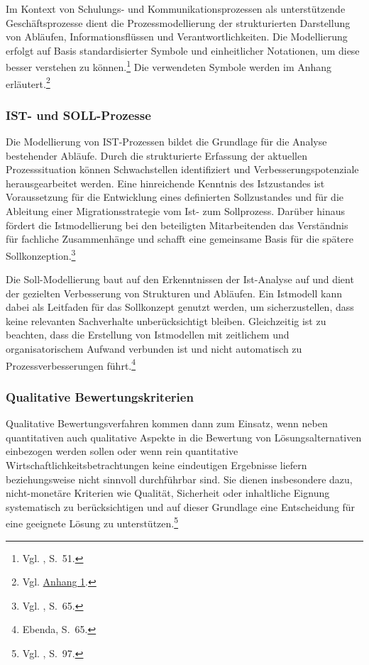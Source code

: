 \documentclass[
    12pt, 
    a4paper,
    ]{scrartcl} %
\begin{document}
Im Kontext von Schulungs- und Kommunikationsprozessen als unterstützende Geschäftsprozesse dient die Prozessmodellierung der strukturierten Darstellung von Abläufen, Informationsflüssen und Verantwortlichkeiten. Die Modellierung erfolgt auf Basis standardisierter Symbole und einheitlicher Notationen, um diese besser verstehen zu können.\footnote{Vgl. \cite{Koch_Geschaeftsprozessmanagement}, S.~51.} Die verwendeten Symbole werden im Anhang erläutert.\footnote{Vgl. \hyperref[sec:Anhang1]{Anhang 1}.} 

\subsubsection{IST- und SOLL-Prozesse}
Die Modellierung von IST-Prozessen bildet die Grundlage für die Analyse bestehender Abläufe. Durch die strukturierte Erfassung der aktuellen Prozesssituation können Schwachstellen identifiziert und Verbesserungspotenziale herausgearbeitet werden. Eine hinreichende Kenntnis des Istzustandes ist Voraussetzung für die Entwicklung eines definierten Sollzustandes und für die Ableitung einer Migrationsstrategie vom Ist- zum Sollprozess. Darüber hinaus fördert die Istmodellierung bei den beteiligten Mitarbeitenden das Verständnis für fachliche Zusammenhänge und schafft eine gemeinsame Basis für die spätere Sollkonzeption.\footnote{Vgl. \cite{Koch_Geschaeftsprozessmanagement}, S.~65.} 

Die Soll-Modellierung baut auf den Erkenntnissen der Ist-Analyse auf und dient der gezielten Verbesserung von Strukturen und Abläufen. Ein Istmodell kann dabei als Leitfaden für das Sollkonzept genutzt werden, um sicherzustellen, dass keine relevanten Sachverhalte unberücksichtigt bleiben. Gleichzeitig ist zu beachten, dass die Erstellung von Istmodellen mit zeitlichem und organisatorischem Aufwand verbunden ist und nicht automatisch zu Prozessverbesserungen führt.\footnote{Ebenda, S.~65.}

\subsubsection{Qualitative Bewertungskriterien}
Qualitative Bewertungsverfahren kommen dann zum Einsatz, wenn neben quantitativen auch qualitative Aspekte in die Bewertung von Lösungsalternativen einbezogen werden sollen oder wenn rein quantitative Wirtschaftlichkeitsbetrachtungen keine eindeutigen Ergebnisse liefern beziehungsweise nicht sinnvoll durchführbar sind. Sie dienen insbesondere dazu, nicht-monetäre Kriterien wie Qualität, Sicherheit oder inhaltliche Eignung systematisch zu berücksichtigen und auf dieser Grundlage eine Entscheidung für eine geeignete Lösung zu unterstützen.\footnote{Vgl. \cite{Koch_Geschaeftsprozessmanagement}, S.~97.} 
\end{document}
